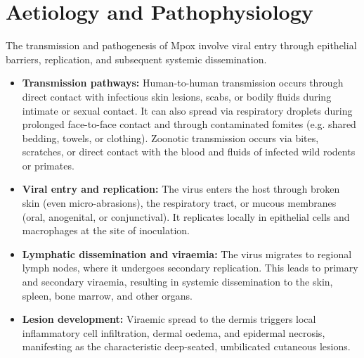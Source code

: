\section*{Aetiology and Pathophysiology}
The transmission and pathogenesis of Mpox involve viral entry through epithelial barriers, replication, and subsequent systemic dissemination.
\begin{itemize}
    \item \textbf{Transmission pathways:} Human-to-human transmission occurs through direct contact with infectious skin lesions, scabs, or bodily fluids during intimate or sexual contact. It can also spread via respiratory droplets during prolonged face-to-face contact and through contaminated fomites (e.g. shared bedding, towels, or clothing). Zoonotic transmission occurs via bites, scratches, or direct contact with the blood and fluids of infected wild rodents or primates.
    \item \textbf{Viral entry and replication:} The virus enters the host through broken skin (even micro-abrasions), the respiratory tract, or mucous membranes (oral, anogenital, or conjunctival). It replicates locally in epithelial cells and macrophages at the site of inoculation.
    \item \textbf{Lymphatic dissemination and viraemia:} The virus migrates to regional lymph nodes, where it undergoes secondary replication. This leads to primary and secondary viraemia, resulting in systemic dissemination to the skin, spleen, bone marrow, and other organs.
    \item \textbf{Lesion development:} Viraemic spread to the dermis triggers local inflammatory cell infiltration, dermal oedema, and epidermal necrosis, manifesting as the characteristic deep-seated, umbilicated cutaneous lesions.
\end{itemize}

